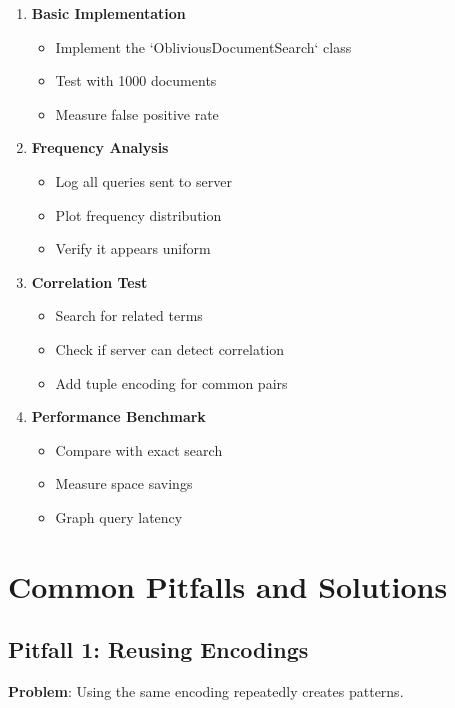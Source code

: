 \begin{enumerate}
    \item \textbf{Basic Implementation}
    \begin{itemize}
        \item Implement the `ObliviousDocumentSearch` class
        \item Test with 1000 documents
        \item Measure false positive rate
    \end{itemize}
    
    \item \textbf{Frequency Analysis}
    \begin{itemize}
        \item Log all queries sent to server
        \item Plot frequency distribution
        \item Verify it appears uniform
    \end{itemize}
    
    \item \textbf{Correlation Test}
    \begin{itemize}
        \item Search for related terms
        \item Check if server can detect correlation
        \item Add tuple encoding for common pairs
    \end{itemize}
    
    \item \textbf{Performance Benchmark}
    \begin{itemize}
        \item Compare with exact search
        \item Measure space savings
        \item Graph query latency
    \end{itemize}
\end{enumerate}

\section{Common Pitfalls and Solutions}

\subsection{Pitfall 1: Reusing Encodings}

\textbf{Problem}: Using the same encoding repeatedly creates patterns.

